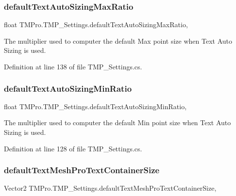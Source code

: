\subsubsection{\texorpdfstring{defaultTextAutoSizingMaxRatio}{defaultTextAutoSizingMaxRatio}}
{\footnotesize\ttfamily float T\+M\+Pro.\+T\+M\+P\+\_\+\+Settings.\+default\+Text\+Auto\+Sizing\+Max\+Ratio\hspace{0.3cm}{\ttfamily [static]}, {\ttfamily [get]}}



The multiplier used to computer the default Max point size when Text Auto Sizing is used. 



Definition at line 138 of file T\+M\+P\+\_\+\+Settings.\+cs.

\mbox{\label{class_t_m_pro_1_1_t_m_p___settings_adcb2d6dfb662aae79cb47d5221744aee}} 
\subsubsection{\texorpdfstring{defaultTextAutoSizingMinRatio}{defaultTextAutoSizingMinRatio}}
{\footnotesize\ttfamily float T\+M\+Pro.\+T\+M\+P\+\_\+\+Settings.\+default\+Text\+Auto\+Sizing\+Min\+Ratio\hspace{0.3cm}{\ttfamily [static]}, {\ttfamily [get]}}



The multiplier used to computer the default Min point size when Text Auto Sizing is used. 



Definition at line 128 of file T\+M\+P\+\_\+\+Settings.\+cs.

\mbox{\label{class_t_m_pro_1_1_t_m_p___settings_a2e8fbfcbda93f2c4b080d39d62363afc}} 
\subsubsection{\texorpdfstring{defaultTextMeshProTextContainerSize}{defaultTextMeshProTextContainerSize}}
{\footnotesize\ttfamily Vector2 T\+M\+Pro.\+T\+M\+P\+\_\+\+Settings.\+default\+Text\+Mesh\+Pro\+Text\+Container\+Size\hspace{0.3cm}{\ttfamily [static]}, {\ttfamily [get]}}



